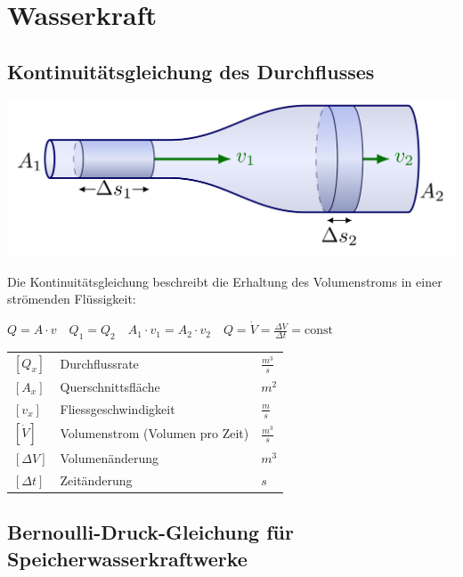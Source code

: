 \newpage
\section{Wasserkraft}


\subsection{Kontinuitätsgleichung des Durchflusses}
\begin{center}
    \includegraphics[width=0.9\columnwidth, align=c]{images/Kontinuitaet.png}
\end{center}

Die Kontinuitätsgleichung beschreibt die Erhaltung des Volumenstroms in einer strömenden Flüssigkeit:

$
\boxed{
    Q = A \cdot v 
} 
\quad
\boxed{
    Q_1 = Q_2 
} 
\quad
\boxed{
    A_1 \cdot v_1 = A_2 \cdot v_2
}
\quad
\boxed{
    Q = \dot{V} = \frac{\Delta V}{\Delta t} = \text{const} 
} 
$

\renewcommand{\arraystretch}{1.2} %
\begin{tabular}{@{} l p{6cm} l @{}}
    $[Q_x]$        & Durchflussrate                     \dotfill & $\frac{m^3}{s}$ \\
    $[A_x]$        & Querschnittsfläche                 \dotfill & $m^2$ \\
    $[v_x]$        & Fliessgeschwindigkeit              \dotfill & $\frac{m}{s}$ \\
    $[\dot{V}]$    & Volumenstrom (Volumen pro Zeit)    \dotfill & $\frac{m^3}{s}$ \\
    $[\Delta V]$   & Volumenänderung                    \dotfill & $m^3$ \\
    $[\Delta t]$   & Zeitänderung                       \dotfill & $s$ \\
\end{tabular}



\subsection{Bernoulli-Druck-Gleichung für Speicherwasserkraftwerke}

